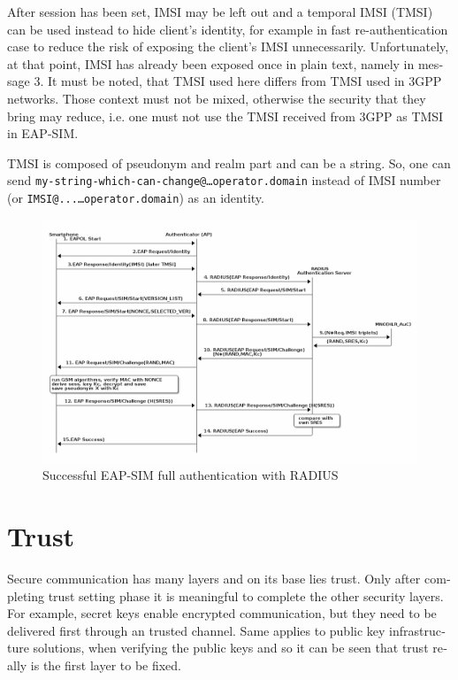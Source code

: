 \documentclass[12pt,a4paper,english]{tutthesis}
\begin{document}
\begin{otherlanguage}{english}
After session has been set, IMSI may be left out and a temporal IMSI
(TMSI) can be used instead to hide client's identity, for example in
fast re-authentication case to reduce the risk of exposing the client's
IMSI unnecessarily. Unfortunately, at that point, IMSI has already
been exposed once in plain text, namely in message 3.
It must be noted, that TMSI used here differs from TMSI used in 3GPP
networks. Those context must not be mixed, otherwise the security that
they bring may reduce, i.e. one must not use the TMSI received from
3GPP as TMSI in EAP-SIM.

TMSI is composed of pseudonym and realm part and can be a
string. So, one can send 
\texttt{my-string-which-can-change@…operator.domain} instead of 
IMSI number (or \texttt{IMSI@...…operator.domain}) as an identity. 










\begin{figure}[htb]
\centering
\includegraphics[width=.9\linewidth]{eap-sim-radius.png}
\caption{\label{fig:eap-sim-radius}Successful EAP-SIM full authentication with RADIUS}
\end{figure}
\section{Trust}
\label{sec-2-7}

Secure communication has many layers and on its base lies trust. 
Only after completing trust setting phase it is meaningful to complete
the other security layers. For example, secret keys enable encrypted
communication, but they need to be delivered first through an trusted
channel. Same applies to public key infrastructure solutions, when
verifying the public keys and so it can be seen that trust
really is the first layer to be fixed.




\end{otherlanguage}
\end{document}
